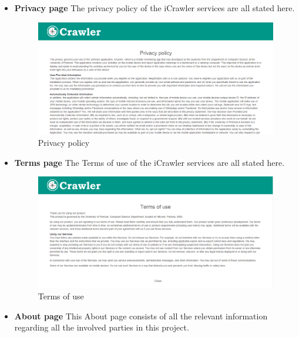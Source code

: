 \documentclass[hidelinks, 12pt, oneside]{article}
\begin{document}
\begin{itemize}
	 	 \item \textbf{Privacy page}\newline
	 	The privacy policy of the iCrawler services are all stated here. 
	 	 
	 	 \begin{figure}[h!]
	 	 	\caption{Privacy policy}
	 	 	\centering 																																		\includegraphics[width=1 \textwidth]{img/dashboard/privacy.png}
	 	 \end{figure}\newpage	
	 	 
	 	 \item \textbf{Terms page}\newline
	 	The Terms of use of the iCrawler services are all stated here. 
	 	 
	 	 \begin{figure}[h!]
	 	 	\caption{Terms of use}
	 	 	\centering 																																		\includegraphics[width=1 \textwidth]{img/dashboard/termsAndUse.png}
	 	 \end{figure}\newpage	
	 	 
	 	 \item \textbf{About page}\newline
	 	This About page consists of all the relevant information regarding all the involved parties in this project. 
	 	 

\end{itemize}
\end{document}
